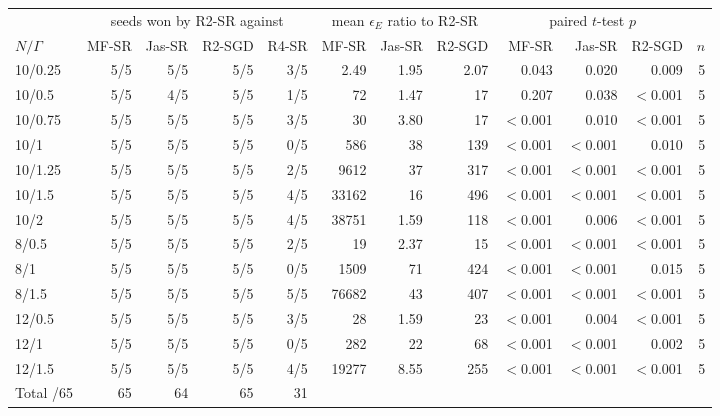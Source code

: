 \begin{tabular}{lrrrr|rrr|rrr|r}\toprule
 & \multicolumn{4}{c|}{seeds won by R2-SR against} & \multicolumn{3}{c|}{mean $\epsilon_E$ ratio to R2-SR} & \multicolumn{3}{c|}{paired $t$-test $p$} & \\
$N/\Gamma$ & MF-SR & Jas-SR & R2-SGD & R4-SR & MF-SR & Jas-SR & R2-SGD & MF-SR & Jas-SR & R2-SGD & $n$ \\\midrule
10/0.25 & 5/5 & 5/5 & 5/5 & 3/5 & 2.49 & 1.95 & 2.07 & 0.043 & 0.020 & 0.009 & 5 \\
10/0.5 & 5/5 & 4/5 & 5/5 & 1/5 & 72 & 1.47 & 17 & 0.207 & 0.038 & $<$0.001 & 5 \\
10/0.75 & 5/5 & 5/5 & 5/5 & 3/5 & 30 & 3.80 & 17 & $<$0.001 & 0.010 & $<$0.001 & 5 \\
10/1 & 5/5 & 5/5 & 5/5 & 0/5 & 586 & 38 & 139 & $<$0.001 & $<$0.001 & 0.010 & 5 \\
10/1.25 & 5/5 & 5/5 & 5/5 & 2/5 & 9612 & 37 & 317 & $<$0.001 & $<$0.001 & $<$0.001 & 5 \\
10/1.5 & 5/5 & 5/5 & 5/5 & 4/5 & 33162 & 16 & 496 & $<$0.001 & $<$0.001 & $<$0.001 & 5 \\
10/2 & 5/5 & 5/5 & 5/5 & 4/5 & 38751 & 1.59 & 118 & $<$0.001 & 0.006 & $<$0.001 & 5 \\
8/0.5 & 5/5 & 5/5 & 5/5 & 2/5 & 19 & 2.37 & 15 & $<$0.001 & $<$0.001 & $<$0.001 & 5 \\
8/1 & 5/5 & 5/5 & 5/5 & 0/5 & 1509 & 71 & 424 & $<$0.001 & $<$0.001 & 0.015 & 5 \\
8/1.5 & 5/5 & 5/5 & 5/5 & 5/5 & 76682 & 43 & 407 & $<$0.001 & $<$0.001 & $<$0.001 & 5 \\
12/0.5 & 5/5 & 5/5 & 5/5 & 3/5 & 28 & 1.59 & 23 & $<$0.001 & 0.004 & $<$0.001 & 5 \\
12/1 & 5/5 & 5/5 & 5/5 & 0/5 & 282 & 22 & 68 & $<$0.001 & $<$0.001 & 0.002 & 5 \\
12/1.5 & 5/5 & 5/5 & 5/5 & 4/5 & 19277 & 8.55 & 255 & $<$0.001 & $<$0.001 & $<$0.001 & 5 \\
\midrule Total /65 & 65 & 64 & 65 & 31 & & & & & & & \\
\bottomrule\end{tabular}
